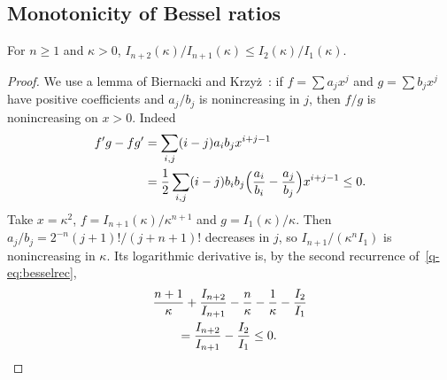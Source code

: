 \subsection{Monotonicity of Bessel ratios}

\begin{lemma}\label{q-lem:ratio}
For $n\ge1$ and $\kappa>0$, $I_{n+2}(\kappa)/I_{n+1}(\kappa)\le I_2(\kappa)/
I_1(\kappa)$.
\end{lemma}

\begin{proof}
We use a lemma of Biernacki and Krzy\.z~\cite{BK55}: if $f=\sum a_jx^j$ and
$g=\sum b_jx^j$ have positive coefficients and $a_j/b_j$ is nonincreasing in
$j$, then $f/g$ is nonincreasing on $x>0$. Indeed
\[
\begin{aligned}
f'g-fg'&=\sum_{i,j}(i-j)a_ib_jx^{i+j-1}\\
&=\frac12\sum_{i,j}(i-j)b_ib_j\Bigl(\frac{a_i}{b_i}-\frac{a_j}{b_j}\Bigr)
x^{i+j-1}\le0 .
\end{aligned}
\]
Take $x=\kappa^2$, $f=I_{n+1}(\kappa)/\kappa^{n+1}$ and $g=I_1(\kappa)/\kappa$.
Then $a_j/b_j=2^{-n}(j+1)!/(j+n+1)!$ decreases in $j$, so $I_{n+1}/(\kappa^n
I_1)$ is nonincreasing in $\kappa$. Its logarithmic derivative is, by the
second recurrence of~\eqref{q-eq:besselrec},
\[
\begin{aligned}
&\frac{n+1}\kappa+\frac{I_{n+2}}{I_{n+1}}-\frac n\kappa-\frac1\kappa-\frac{I_2}
{I_1}\\
&\qquad=\frac{I_{n+2}}{I_{n+1}}-\frac{I_2}{I_1}\le0 .
\end{aligned}\qedhere
\]
\end{proof}

